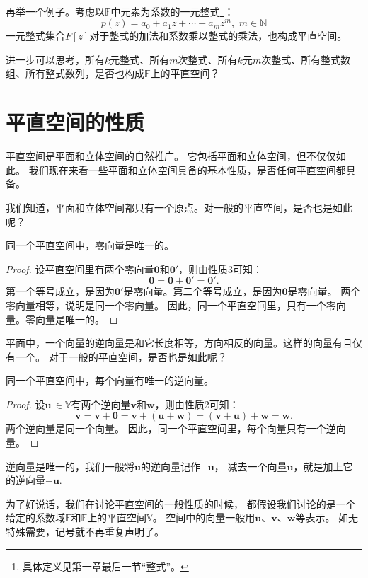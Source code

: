 \documentclass[12pt,UTF8]{ctexbook}
\begin{document}
再举一个例子。考虑以$\mathbb{F}$中元素为系数的一元整式\footnote{具体定义见第一章最后一节“整式”。}：
$$ p(z) = a_0 + a_1 z + \cdots + a_m z^m, \,\, m \in \mathbb{N} $$
一元整式集合$F[z]$对于整式的加法和系数乘以整式的乘法，也构成平直空间。

进一步可以思考，所有$k$元整式、所有$m$次整式、所有$k$元$m$次整式、所有整式数组、所有整式数列，是否也构成$\mathbb{F}$上的平直空间？

\section{平直空间的性质}
平直空间是平面和立体空间的自然推广。
它包括平面和立体空间，但不仅仅如此。
我们现在来看一些平面和立体空间具备的基本性质，是否任何平直空间都具备。

我们知道，平面和立体空间都只有一个原点。对一般的平直空间，是否也是如此呢？

\begin{pp}\label{pp:1_1}
同一个平直空间中，零向量是唯一的。
\end{pp} 
\begin{proof} %
    设平直空间里有两个零向量$\mathbf{0}$和$\mathbf{0}'$，则由性质3可知：
    $$ \mathbf{0} = \mathbf{0} + \mathbf{0}' = \mathbf{0}'.$$
    第一个等号成立，是因为$\mathbf{0}'$是零向量。第二个等号成立，是因为$\mathbf{0}$是零向量。
    两个零向量相等，说明是同一个零向量。
    因此，同一个平直空间里，只有一个零向量。零向量是唯一的。
\end{proof}
 

平面中，一个向量的逆向量是和它长度相等，方向相反的向量。这样的向量有且仅有一个。
对于一般的平直空间，是否也是如此呢？
\begin{pp}\label{pp:1_2}
同一个平直空间中，每个向量有唯一的逆向量。
\end{pp} 
\begin{proof} %
    设$\mathbf{u} \, \in \mathbb{V}$有两个逆向量$\mathbf{v}$和$\mathbf{w}$，则由性质2可知：
    $$ \mathbf{v} = \mathbf{v} + \mathbf{0} = \mathbf{v} + (\mathbf{u}+\mathbf{w}) = (\mathbf{v}+\mathbf{u}) + \mathbf{w} = \mathbf{w}.$$
    两个逆向量是同一个向量。
    因此，同一个平直空间里，每个向量只有一个逆向量。
\end{proof}
 
逆向量是唯一的，我们一般将$\mathbf{u}$的逆向量记作$-\mathbf{u}$，
减去一个向量$\mathbf{u}$，就是加上它的逆向量$-\mathbf{u}$.

为了好说话，我们在讨论平直空间的一般性质的时候，
都假设我们讨论的是一个给定的系数域$\mathbb{F}$和$\mathbb{F}$上的平直空间$\mathbb{V}$。
空间中的向量一般用$\mathbf{u}$、$\mathbf{v}$、$\mathbf{w}$等表示。
如无特殊需要，记号就不再重复声明了。
\end{document}
